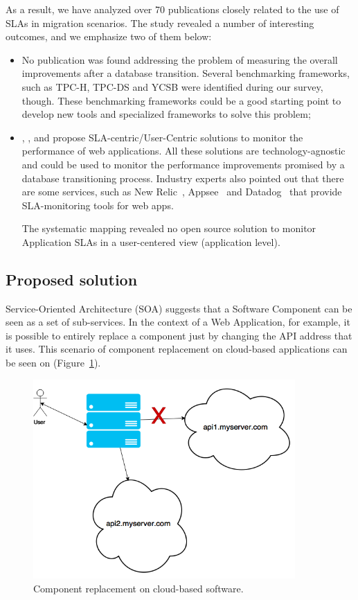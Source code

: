 \documentclass{article}
\begin{document}
As a result, we have analyzed over 70 publications closely related to the use of SLAs in migration scenarios. The study revealed a number of interesting outcomes, and we emphasize two of them below:

\begin{itemize}
\item{No publication was found addressing the problem of measuring the overall improvements after a database transition. Several benchmarking frameworks, such as TPC-H, TPC-DS and YCSB were identified\cite{6616442} during our survey, though. These benchmarking frameworks could be a good starting point to develop new tools and specialized frameworks to solve this problem;
}

\item{ \cite{6253526}, \cite{6461875}, \cite{6511780} and \cite{Xiong:2011:APA:2038916.2038931} propose SLA-centric/User-Centric solutions to monitor the performance of web applications. All these solutions are technology-agnostic and could be used to monitor the performance improvements promised by a database transitioning process. Industry experts also pointed out that there are some services, such as New Relic~\cite{newrelic}, Appsee~\cite{appsee} and Datadog~\cite{datadog} that provide SLA-monitoring tools for web apps. 

The systematic mapping revealed no open source solution to monitor Application SLAs in a user-centered view (application level).  
}

\end{itemize}

\subsection{Proposed solution}

Service-Oriented Architecture (SOA) suggests that a Software Component can be seen as a set of sub-services. In the context of a Web Application, for example, it is possible to entirely replace a component just by changing the API address that it uses. This scenario of component replacement on cloud-based applications can be seen on (Figure~\ref{fig:apireplacement}).

\begin{figure}[ht!]
\centering
\includegraphics[width=100mm]{api.png}
\caption{Component replacement on cloud-based software.\label{fig:apireplacement}}
\end{figure}
\end{document}
